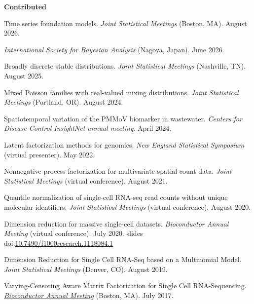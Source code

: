 \documentclass[10pt]{article}
\newcommand\doilink[1]{\href{https://dx.doi.org/#1}{#1}}
\newcommand\doi[1]{doi:\doilink{#1}}
\begin{document}
\textbf{Contributed}
\begin{enumerate}[label= {[\arabic*]}]
\item Time series foundation models. {\it Joint Statistical Meetings} (Boston, MA). August 2026.
\item {\it International Society for Bayesian Analysis} (Nagoya, Japan). June 2026.
\item Broadly discrete stable distributions. {\it Joint Statistical Meetings} (Nashville, TN). August 2025.
\item Mixed Poisson families with real-valued mixing distributions. {\it Joint Statistical Meetings} (Portland, OR). August 2024.
\item Spatiotemporal variation of the PMMoV biomarker in wastewater. {\it Centers for Disease Control InsightNet annual meeting}. April 2024.
\item Latent factorization methods for genomics. {\it New England Statistical Symposium} (virtual presenter). May 2022.
\item Nonnegative process factorization for multivariate spatial count data. {\it Joint Statistical Meetings} (virtual conference). August 2021.
\item Quantile normalization of single-cell RNA-seq read counts without unique molecular identifiers. {\it Joint Statistical Meetings} (virtual conference). August 2020.
\item Dimension reduction for massive single-cell datasets. {\it Bioconductor Annual Meeting} (virtual conference). July 2020. slides \doi{10.7490/f1000research.1118084.1}
\item Dimension Reduction for Single Cell RNA-Seq based on a Multinomial Model. {\it Joint Statistical Meetings} (Denver, CO). August 2019.
\item Varying-Censoring Aware Matrix Factorization for Single Cell RNA-Sequencing. \href{https://www.bioconductor.org/help/course-materials/2017/BioC2017/}{{\it Bioconductor Annual Meeting}} (Boston, MA). July 2017.
\end{enumerate}
\end{document}
